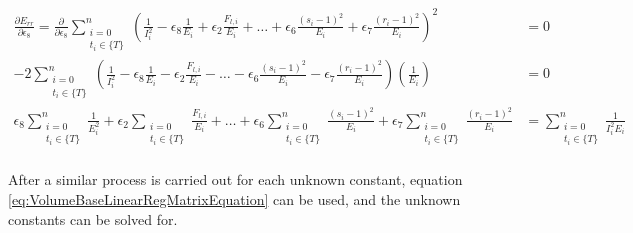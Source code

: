 \begin{equation*}
    \begin{split}
        \frac{\partial E_{rr}}{\partial \epsilon_8}=
        \frac{\partial}{\partial \epsilon_8}\sum_{
                \substack{i=0\\ t_i\in \{ T \}}
            }^n \left(
            \frac{1}{I_i^2}
            -\epsilon_8 \frac{1}{E_i}
            +\epsilon_2 \frac{F_{l,i}}{E_i}
            +\dots
            +\epsilon_6 \frac{(s_i-1)^2}{E_i}
            +\epsilon_7 \frac{(r_i-1)^2}{E_i}
        \right)^2&=0
        \\
        -2\sum_{
                \substack{i=0\\ t_i\in \{ T \}}
            }^n \left(
            \frac{1}{I_i^2}
            -\epsilon_8 \frac{1}{E_i}
            -\epsilon_2 \frac{F_{l,i}}{E_i}
            -\dots
            -\epsilon_6 \frac{(s_i-1)^2}{E_i}
           	-\epsilon_7 \frac{(r_i-1)^2}{E_i}
        \right)\left( \frac{1}{E_i} \right)&=0 
        \\
        \epsilon_8 \sum_{\substack{i=0\\ t_i\in \{ T \}}}^n \frac{1}{E_i^2} 
        +\epsilon_2 \sum_{\substack{i=0\\ t_i\in \{ T \}}} \frac{F_{l,i}}{E_i}
        +\dots
        +\epsilon_6 \sum_{\substack{i=0\\ t_i\in \{ T \}}}^n \frac{(s_i-1)^2}{E_i}
        +\epsilon_7 \sum_{\substack{i=0\\ t_i\in \{ T \}}}^n \frac{(r_i-1)^2}{E_i}
        &=
        \sum_{\substack{i=0\\ t_i\in \{ T \}}}^n \frac{1}{I_i^2E_i}
        \\
    \end{split}
\end{equation*}

After a similar process is carried out for each unknown constant, equation \ref{eq:VolumeBaseLinearRegMatrixEquation} can be used, and the unknown constants can be solved for.

